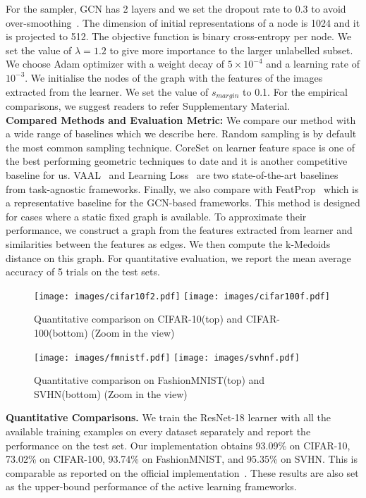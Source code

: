For the sampler, GCN has 2 layers and we set the dropout rate to 0.3 to avoid over-smoothing~\cite{zhao2019pairnorm}.
The dimension of initial representations of a node is 1024 and it is projected to 512.
The objective function is binary cross-entropy per node. 
We set the value of $\lambda = 1.2$ to give more importance to the larger unlabelled subset. 
We choose Adam \cite{Kingma2015ADAM:Optimization} optimizer with a weight decay of $5 \times 10^{-4}$ and 
a learning rate of $10^{-3}$. We initialise the nodes of the graph with the features of the images extracted from the learner. 
We set the value of $s_{margin}$ to 0.1. For the empirical comparisons, we suggest readers to refer Supplementary Material.
\\
\noindent \textbf{Compared Methods and Evaluation Metric:} We compare our method with
a wide range of baselines which we describe here. 
Random sampling is by default the most common sampling technique. 
CoreSet\cite{Sener2017ActiveApproach} on learner feature space is one of the
best performing geometric techniques to date and it is another competitive baseline for us. 
VAAL~\cite{Sinha2019VariationalLearning} and Learning Loss~\cite{Yoo2019LearningLearning} 
are two state-of-the-art baselines from task-agnostic frameworks.
Finally, we also compare with FeatProp~\cite{Wu2019ActivePropagation} which 
is a representative baseline for the GCN-based frameworks. This method is designed for cases 
where a static fixed graph is available. To approximate their performance, we construct 
a graph from the features extracted from learner and similarities between the features
as edges. We then compute the k-Medoids distance on this graph.
For quantitative evaluation, we report the mean average accuracy of 
5 trials on the test sets.

\begin{figure}
    \centering
    \texttt{[image: images/cifar10f2.pdf]}
    \texttt{[image: images/cifar100f.pdf]}
    \caption{Quantitative comparison on CIFAR-10(top) and CIFAR-100(bottom) (Zoom in the view)}
    \label{fig:cf10}
\end{figure}
\begin{figure}
    \centering
    \texttt{[image: images/fmnistf.pdf]}
    \texttt{[image: images/svhnf.pdf]}
    \caption{Quantitative comparison on FashionMNIST(top) and SVHN(bottom) (Zoom in the view)}
    \label{fig:fm}
\end{figure}
\noindent \textbf{Quantitative Comparisons.} We train the ResNet-18 learner with all the available training examples on every dataset separately and report the performance on the test set. Our 
implementation obtains 93.09\% on CIFAR-10, 73.02\% on CIFAR-100, 93.74\% on FashionMNIST, 
and  95.35\% on SVHN. This is comparable as reported on the official implementation~\cite{he2016deep}.
These results are also set as the upper-bound performance of the active learning frameworks.


